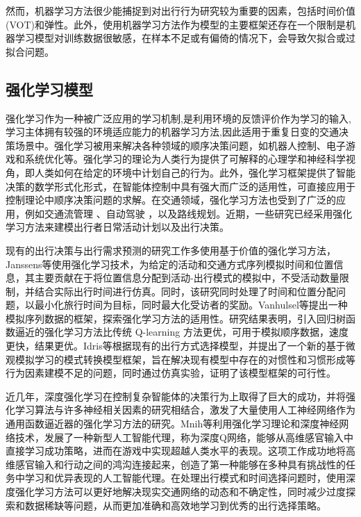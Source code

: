 然而，机器学习方法很少能捕捉到对出行行为研究较为重要的因素，包括时间价值(VOT)和弹性\cite{koushik2020machine}。此外，使用机器学习方法作为模型的主要框架还存在一个限制是机器学习模型对训练数据很敏感，在样本不足或有偏倚的情况下，会导致欠拟合或过拟合问题\cite{singh2016review}。



\subsection{强化学习模型}

强化学习作为一种被广泛应用的学习机制,是利用环境的反馈评价作为学习的输入,学习主体拥有较强的环境适应能力的机器学习方法,因此适用于重复日变的交通决策场景中。强化学习被用来解决各种领域的顺序决策问题，如机器人控制、电子游戏和系统优化等。强化学习的理论为人类行为提供了可解释的心理学和神经科学视角，即人类如何在给定的环境中计划自己的行为。此外，强化学习框架提供了智能决策的数学形式化形式，在智能体控制中具有强大而广泛的适用性，可直接应用于控制理论中顺序决策问题的求解。在交通领域，强化学习方法也受到了广泛的应用，例如交通流管理 \citep{walraven2016traffic, ning2020joint, cruciol2013reward}、自动驾驶 \citep{grigorescu2020survey, aradi2022survey, zhu2018human} ，以及路线规划\citep{yu2019learning}。近期，一些研究已经采用强化学习方法来建模出行者日常活动计划以及出行决策。

现有的出行决策与出行需求预测的研究工作多使用基于价值的强化学习方法，Janssens等\cite{janssens2007allocating}使用强化学习技术，为给定的活动和交通方式序列模拟时间和位置信息，其主要贡献在于将位置信息分配到活动-出行模式的模拟中，不受活动数量限制，并结合实际出行时间进行仿真。同时，该研究同时处理了时间和位置分配问题，以最小化旅行时间为目标，同时最大化受访者的奖励。Vanhulsel等\cite{vanhulsel2009simulation}提出一种模拟序列数据的框架，探索强化学习方法的适用性。研究结果表明，引入回归树函数逼近的强化学习方法比传统 Q-learning 方法更优，可用于模拟顺序数据，速度更快，结果更优。Idris等\cite{idris2012towards}根据现有的出行方式选择模型，并提出了一个新的基于微观模拟学习的模式转换模型框架，旨在解决现有模型中存在的对惯性和习惯形成等行为因素建模不足的问题，同时通过仿真实验，证明了该模型框架的可行性。

近几年，深度强化学习在控制复杂智能体的决策行为上取得了巨大的成功，并将强化学习算法与许多神经相关因素的研究相结合，激发了大量使用人工神经网络作为通用函数逼近器的强化学习方法的研究。Mnih等\cite{mnih2015human}利用强化学习理论和深度神经网络技术，发展了一种新型人工智能代理，称为深度Q网络，能够从高维感官输入中直接学习成功策略，进而在游戏中实现超越人类水平的表现。这项工作成功地将高维感官输入和行动之间的鸿沟连接起来，创造了第一种能够在多种具有挑战性的任务中学习和优异表现的人工智能代理。在处理出行模式和时间选择问题时，使用深度强化学习方法可以更好地解决现实交通网络的动态和不确定性，同时减少过度探索和数据稀缺等问题，从而更加准确和高效地学习到优秀的出行选择策略。

